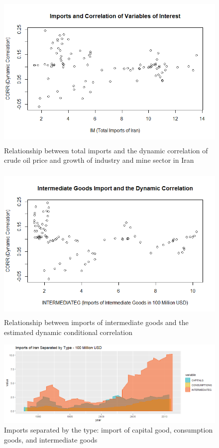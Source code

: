 \documentclass{article}
\begin{document}
\begin{figure}[htbp]
	\begin{center}
		\includegraphics[height=3in]{total_import.png}
		\caption{Relationship between total imports and the dynamic correlation of crude oil price and growth of industry and mine sector in Iran}
	\end{center}
\end{figure}

\begin{figure}[htbp]
	\begin{center}
		\includegraphics[height=3in]{intermed.png}
		\caption{Relationship between imports of intermediate goods and the estimated dynamic conditional correlation}
	\end{center}
\end{figure}


\begin{figure}[htbp]
	\begin{center}
		\includegraphics[width=\linewidth]{imports_type.png}
		\caption{Imports separated by the type: import of capital good, consumption goods, and intermediate goods}
	\end{center}
\end{figure}
\end{document}
